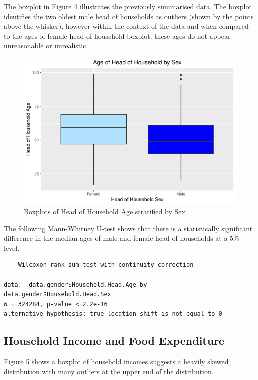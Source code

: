 \documentclass[
]{article}
\begin{document}
The boxplot in Figure 4 illustrates the previously summarised data. The
boxplot identifies the two oldest male head of households as outliers
(shown by the points above the whisker), however within the context of
the data and when compared to the ages of female head of household
boxplot, these ages do not appear unreasonable or unrealistic.

\begin{figure}

{\centering \includegraphics[width=0.8\linewidth]{Group_01_Project2_demo_files/figure-latex/boxplot of age by gender-1} 

}

\caption{Boxplots of Head of Household Age stratified by Sex}\label{fig:boxplot of age by gender}
\end{figure}

The following Mann-Whitney U-test shows that there is a statistically
significant difference in the median ages of male and female head of
households at a 5\% level.

\begin{verbatim}
    Wilcoxon rank sum test with continuity correction

data:  data.gender$Household.Head.Age by data.gender$Household.Head.Sex
W = 324284, p-value < 2.2e-16
alternative hypothesis: true location shift is not equal to 0
\end{verbatim}

\hypertarget{household-income-and-food-expenditure}{%
\subsection{Household Income and Food
Expenditure}\label{household-income-and-food-expenditure}}

Figure 5 shows a boxplot of household incomes suggests a heavily skewed
distribution with many outliers at the upper end of the distribution.
\end{document}

